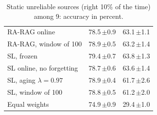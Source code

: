 \begin{table}
\begin{tabular}{@{}lrr@{}}
\quad RA-RAG online & 78.5\,{\scriptsize$\pm$0.9} & 63.1\,{\scriptsize$\pm$1.1} \\
\quad RA-RAG, window of 100 & 78.9\,{\scriptsize$\pm$0.5} & 63.2\,{\scriptsize$\pm$1.4} \\
\quad SL, frozen & 79.4\,{\scriptsize$\pm$0.7} & 63.8\,{\scriptsize$\pm$1.3} \\
\quad SL online, no forgetting & 78.7\,{\scriptsize$\pm$0.6} & 63.6\,{\scriptsize$\pm$1.4} \\
\quad SL, aging $\lambda=0.97$ & 78.9\,{\scriptsize$\pm$0.4} & 61.7\,{\scriptsize$\pm$2.6} \\
\quad SL, window of 100 & 78.8\,{\scriptsize$\pm$0.5} & 61.2\,{\scriptsize$\pm$2.0} \\
\quad Equal weights & 74.9\,{\scriptsize$\pm$0.9} & 29.4\,{\scriptsize$\pm$1.0} \\
\bottomrule
\end{tabular}
\caption{Static unreliable sources (right 10\% of the time) among 9: accuracy in percent.}
\label{tab:unreliable}
\end{table}
